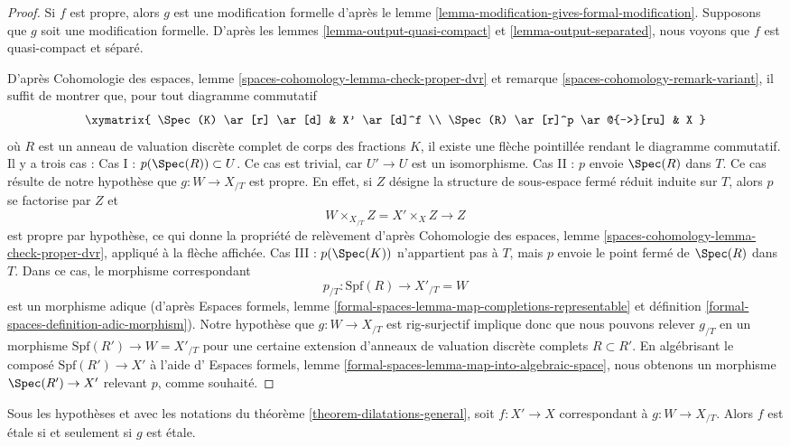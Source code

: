 \begin{proof}
Si $f$ est propre, alors $g$ est une modification formelle d'après le
lemme \ref{lemma-modification-gives-formal-modification}.
Supposons que $g$ soit une modification formelle. D'après les
lemmes \ref{lemma-output-quasi-compact} et \ref{lemma-output-separated},
nous voyons que $f$ est quasi-compact et séparé.

\medskip\noindent
D'après Cohomologie des espaces, lemme
\ref{spaces-cohomology-lemma-check-proper-dvr} et
remarque \ref{spaces-cohomology-remark-variant},
il suffit de montrer que, pour tout diagramme commutatif
$$
\xymatrix{
\Spec(K) \ar[r] \ar[d] & X' \ar[d]^f \\
\Spec(R) \ar[r]^p \ar@{-->}[ru] & X
}
$$
où $R$ est un anneau de valuation discrète complet de corps des fractions
$K$, il existe une flèche pointillée rendant le diagramme commutatif.
Il y a trois cas :
Cas I : $p(\Spec(R)) \subset U$. Ce cas est trivial,
car $U' \to U$ est un isomorphisme.
Cas II : $p$ envoie $\Spec(R)$ dans $T$. Ce cas résulte
de notre hypothèse que $g : W \to X_{/T}$ est propre. En effet,
si $Z$ désigne la structure de sous-espace fermé réduit induite
sur $T$, alors $p$ se factorise par $Z$ et
$$
W \times_{X_{/T}} Z = X' \times_X Z \longrightarrow Z
$$
est propre par hypothèse, ce qui donne la propriété de relèvement d'après
Cohomologie des espaces, lemme \ref{spaces-cohomology-lemma-check-proper-dvr},
appliqué à la flèche affichée. Cas III : $p(\Spec(K))$ n'appartient pas à
$T$, mais $p$ envoie le point fermé de $\Spec(R)$ dans $T$. Dans ce cas,
le morphisme correspondant
$$
p_{/T} : \text{Spf}(R) \longrightarrow X'_{/T} = W
$$
est un morphisme adique (d'après
Espaces formels, lemme
\ref{formal-spaces-lemma-map-completions-representable} et
définition \ref{formal-spaces-definition-adic-morphism}).
Notre hypothèse que $g : W \to X_{/T}$ est rig-surjectif
implique donc que nous pouvons relever $g_{/T}$ en un morphisme
$\text{Spf}(R') \to W = X'_{/T}$
pour une certaine extension d'anneaux de valuation discrète complets
$R \subset R'$. En algébrisant le composé $\text{Spf}(R') \to X'$ à l'aide d'
Espaces formels, lemme \ref{formal-spaces-lemma-map-into-algebraic-space},
nous obtenons un morphisme $\Spec(R') \to X'$ relevant $p$, comme souhaité.
\end{proof}

\begin{lemma}
\label{lemma-output-etale}
Sous les hypothèses et avec les notations du
théorème \ref{theorem-dilatations-general}, soit $f : X' \to X$
correspondant à $g : W \to X_{/T}$.
Alors $f$ est étale si et seulement si $g$ est étale.
\end{lemma}

